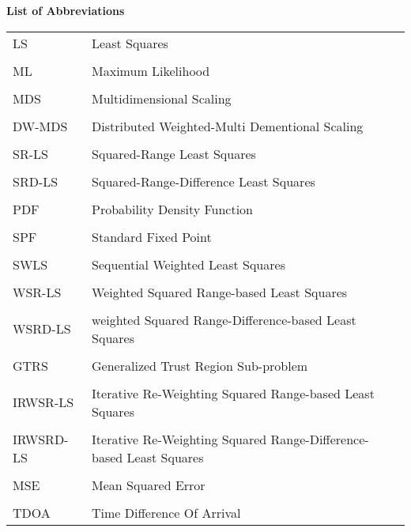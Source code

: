 \newpage


\phantom{m}

\begin{flushleft}
\begin{Huge}
\textbf{List of Abbreviations}
\end{Huge}
\end{flushleft}

\phantom{m}

\begin{longtable}[h]{l l}
LS & Least Squares \\
\\
ML & Maximum Likelihood \\
\\
MDS & Multidimensional Scaling \\ 
\\
DW-MDS & Distributed Weighted-Multi Dementional Scaling \\
\\
SR-LS  & Squared-Range Least Squares \\
\\
SRD-LS & Squared-Range-Difference Least Squares \\
\\
PDF & Probability Density Function \\
\\
SPF & Standard Fixed Point\\
\\
SWLS & Sequential Weighted Least Squares \\
\\
WSR-LS & Weighted Squared Range-based Least Squares \\
\\
WSRD-LS & weighted Squared Range-Difference-based Least Squares \\
\\
GTRS & Generalized Trust Region Sub-problem \\
\\
IRWSR-LS & Iterative Re-Weighting Squared Range-based Least Squares \\
\\
IRWSRD-LS & Iterative Re-Weighting Squared Range-Difference-based Least Squares\\
\\
MSE & Mean Squared Error\\
\\
TDOA &  Time Difference Of Arrival \\

\end{longtable}
